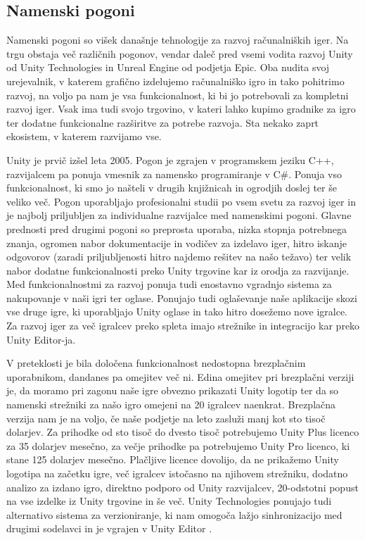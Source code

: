 \documentclass[12pt,a4paper,twoside]{book}
\begin{document}
\subsection{Namenski pogoni}
Namenski pogoni so višek današnje tehnologije za razvoj računalniških iger. Na trgu obstaja več različnih pogonov, vendar daleč pred vsemi vodita razvoj Unity od Unity Technologies in Unreal Engine od podjetja Epic. Oba nudita svoj urejevalnik, v katerem grafično izdelujemo računalniško igro in tako pohitrimo razvoj, na voljo pa nam je vsa funkcionalnost, ki bi jo potrebovali za kompletni razvoj iger. Vsak ima tudi svojo trgovino, v kateri lahko kupimo gradnike za igro ter dodatne funkcionalne razširitve za potrebe razvoja. Sta nekako zaprt ekosistem, v katerem razvijamo vse.

Unity je prvič izšel leta 2005. Pogon je zgrajen v programskem jeziku C++, razvijalcem pa ponuja vmesnik za namensko programiranje v C\#. Ponuja vso funkcionalnost, ki smo jo našteli v drugih knjižnicah in ogrodjih doslej ter še veliko več. Pogon uporabljajo profesionalni studii po vsem svetu za razvoj iger in je najbolj priljubljen za individualne razvijalce med namenskimi pogoni. Glavne prednosti pred drugimi pogoni so preprosta uporaba, nizka stopnja potrebnega znanja, ogromen nabor dokumentacije in vodičev za izdelavo iger, hitro iskanje odgovorov (zaradi priljubljenosti hitro najdemo rešitev na našo težavo) ter velik nabor dodatne funkcionalnosti preko Unity trgovine kar iz orodja za razvijanje. Med funkcionalnostmi za razvoj ponuja tudi enostavno vgradnjo sistema za nakupovanje v naši igri ter oglase. Ponujajo tudi oglaševanje naše aplikacije skozi vse druge igre, ki uporabljajo Unity oglase in tako hitro dosežemo nove igralce. Za razvoj iger za več igralcev preko spleta imajo strežnike in integracijo kar preko Unity Editor-ja.

V preteklosti je bila določena funkcionalnost nedostopna brezplačnim uporabnikom, dandanes pa omejitev več ni. Edina omejitev pri brezplačni verziji je, da moramo pri zagonu naše igre obvezno prikazati Unity logotip ter da so namenski strežniki za našo igro omejeni na 20 igralcev naenkrat. Brezplačna verzija nam je na voljo, če naše podjetje na leto zasluži manj kot sto tisoč dolarjev. Za prihodke od sto tisoč do dvesto tisoč potrebujemo Unity Plus licenco za 35 dolarjev mesečno, za večje prihodke pa potrebujemo Unity Pro licenco, ki stane 125 dolarjev mesečno. Plačljive licence dovolijo, da ne prikažemo Unity logotipa na začetku igre, več igralcev istočasno na njihovem strežniku, dodatno analizo za izdano igro, direktno podporo od Unity razvijalcev, 20-odstotni popust na vse izdelke iz Unity trgovine in še več. Unity Technologies ponujajo tudi alternativo sistema za verzioniranje, ki nam omogoča lažjo sinhronizacijo med drugimi sodelavci in je vgrajen v Unity Editor \cite{unityFeatures}.
\end{document}
